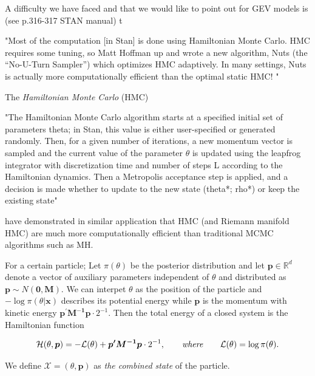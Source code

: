 A difficulty we have faced and that we would like to point out for GEV models is (see p.316-317 STAN manual) t




"Most of the computation [in Stan] is done using Hamiltonian Monte Carlo. HMC requires some tuning, so Matt Hoffman up and wrote a new algorithm, Nuts (the “No-U-Turn Sampler”) which optimizes HMC adaptively. In many settings, Nuts is actually more computationally efficient than the optimal static HMC! "

The \emph{Hamiltonian Monte Carlo} (HMC)

"The Hamiltonian Monte Carlo algorithm starts at a specified initial set of parameters
theta; in Stan, this value is either user-specified or generated randomly. Then, for a given
number of iterations, a new momentum vector is sampled and the current value of
the parameter $\theta$ is updated using the leapfrog integrator with discretization time 
and number of steps L according to the Hamiltonian dynamics. Then a Metropolis
acceptance step is applied, and a decision is made whether to update to the new state
(theta*; rho*) or keep the existing state" \cite{stan_stan_2016}



\cite{Hartmann_bayesian_2016} have demonstrated in similar application that HMC  (and Riemann manifold HMC) are much more computationally efficient than traditional MCMC algorithms such as MH. 

\begin{definition}
	For a certain particle; Let $\pi(\theta)$ be the posterior distribution and let $\boldsymbol{p}\in\mathbb{R}^d$ denote a vector of auxiliary parameters independent of $\theta$ and distributed as $\boldsymbol{p}\sim N(\boldsymbol{0},\boldsymbol{M})$. We can interpet $\theta$ as the position of the particle and $-\log\pi(\theta|\boldsymbol{x})$ describes its potential energy while $\boldsymbol{p}$ is the momentum with kinetic energy $\boldsymbol{p^{'}M^{-1}p}\cdot2^{-1}$. Then the total energy of a closed system is the Hamiltonian function 
	
	\begin{equation}
	\mathcal{H}(\theta,\boldsymbol{p})=-\mathcal{L}(\theta)+\boldsymbol{p'M^{-1}p}\cdot 2^{-1}, \qquad\text{\emph{where}}\qquad \mathcal{L}(\theta)=\log\pi(\theta).
	\end{equation}
\end{definition}

 We define $\mathcal{X} = (\theta, \boldsymbol{p})$ as \emph{the combined state} of the particle.
 
